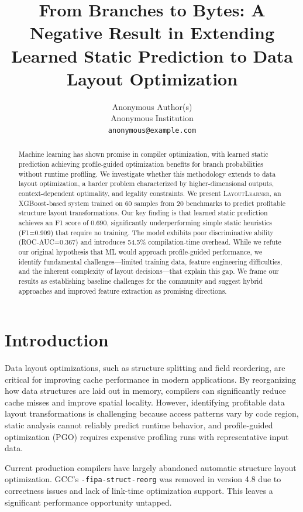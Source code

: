 \documentclass{article}
\title{From Branches to Bytes: A Negative Result in Extending\\
Learned Static Prediction to Data Layout Optimization}
\author{%
  Anonymous Author(s)\\
  Anonymous Institution\\
  \texttt{anonymous@example.com}
}
\begin{document}
\maketitle

\begin{abstract}
Machine learning has shown promise in compiler optimization, with learned static prediction achieving profile-guided optimization benefits for branch probabilities without runtime profiling. We investigate whether this methodology extends to data layout optimization, a harder problem characterized by higher-dimensional outputs, context-dependent optimality, and legality constraints. We present \textsc{LayoutLearner}, an XGBoost-based system trained on 60 samples from 20 benchmarks to predict profitable structure layout transformations. Our key finding is that learned static prediction achieves an F1 score of 0.690, significantly underperforming simple static heuristics (F1=0.909) that require no training. The model exhibits poor discriminative ability (ROC-AUC=0.367) and introduces 54.5\% compilation-time overhead. While we refute our original hypothesis that ML would approach profile-guided performance, we identify fundamental challenges---limited training data, feature engineering difficulties, and the inherent complexity of layout decisions---that explain this gap. We frame our results as establishing baseline challenges for the community and suggest hybrid approaches and improved feature extraction as promising directions.
\end{abstract}

\section{Introduction}
\label{sec:intro}

Data layout optimizations, such as structure splitting and field reordering, are critical for improving cache performance in modern applications. By reorganizing how data structures are laid out in memory, compilers can significantly reduce cache misses and improve spatial locality. However, identifying profitable data layout transformations is challenging because access patterns vary by code region, static analysis cannot reliably predict runtime behavior, and profile-guided optimization (PGO) requires expensive profiling runs with representative input data.

Current production compilers have largely abandoned automatic structure layout optimization. GCC's \texttt{-fipa-struct-reorg} was removed in version 4.8 due to correctness issues and lack of link-time optimization support. This leaves a significant performance opportunity untapped.
\end{document}
